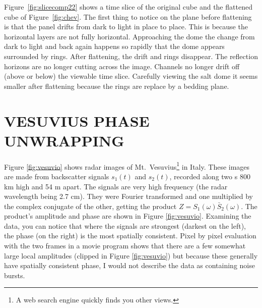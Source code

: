 \par
Figure~\ref{fig:slicecomp22} shows a time slice of the original cube
and the flattened cube of Figure~\ref{fig:chev}.
The first thing to notice on the plane before flattening is that the panel 
drifts from dark to light in place to place.
This is because the horizontal layers are not fully horizontal.
Approaching the dome the change from dark to light and 
back again happens so rapidly that the dome appears surrounded by rings.
After flattening, the drift and rings disappear.
The reflection horizons are no longer cutting across the image.
Channels no longer drift off (above or below) the viewable time slice.
Carefully viewing the salt dome it seems smaller after flattening because the 
rings are replace by a bedding plane.
%

%
%

\section{VESUVIUS PHASE UNWRAPPING}
Figure \ref{fig:vesuvio} shows
radar images of
Mt.~Vesuvius\footnote{
        A web search engine quickly finds you other views.
        }
in Italy.
These images are made from backscatter
signals $s_1(t)$ and $s_2(t)$,
recorded along two s 800 km high and 54 m apart.
The signals are very high frequency
(the radar wavelength being 2.7 cm).
They were Fourier transformed
and one multiplied by the complex conjugate of the other,
getting the product $Z=S_1(\omega) \bar S_2(\omega)$.
The product's amplitude and phase are shown in Figure \ref{fig:vesuvio}.
Examining the data,
you can notice that where the signals are strongest (darkest on the left),
the phase (on the right)
is the most spatially consistent.
Pixel by pixel evaluation with the two frames in a movie program
shows that there are a few somewhat large local amplitudes
(clipped in Figure \ref{fig:vesuvio})
but because these generally have spatially consistent phase,
I would not describe the data as containing noise bursts.

